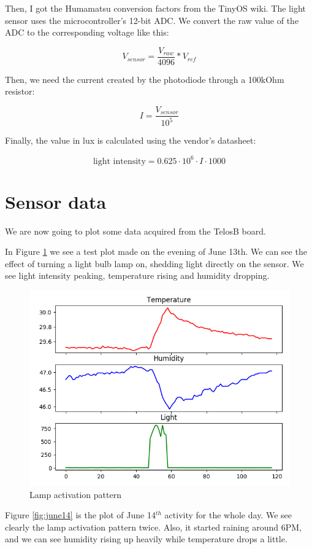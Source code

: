 \documentclass[11pt]{article}
\begin{document}
Then, I got the Humamatsu conversion factors from the TinyOS wiki. The light sensor uses the microcontroller's 12-bit ADC. We convert the raw value of the ADC to the corresponding voltage like this:

$$ V_{sensor}=\frac{V_{raw}}{4096} * V_{ref} $$ 

Then, we need the current created by the photodiode through a 100kOhm resistor:

$$I = \frac{ V_{sensor} }{10^5}$$

Finally, the value in lux is calculated using the vendor's datasheet: 

$$\text{light intensity} = 0.625\cdot10^6 \cdot I \cdot 1000$$
  

\section{Sensor data}

We are now going to plot some data acquired from the TelosB board.

In Figure \ref{fig:lamp} we see a test plot made on the evening of June 13th. We can see the effect of turning a light bulb lamp on, shedding light directly on the sensor. We see light intensity peaking, temperature rising and humidity dropping.


\begin{figure}[h]
\includegraphics[width=\textwidth]{lamp}
\caption{Lamp activation pattern}
\label{fig:lamp}
\end{figure}

Figure \ref{fig:june14} is the plot of June 14$^{th}$ activity for the whole day. We see clearly the lamp activation pattern twice. Also, it started raining around 6PM, and we can see humidity rising up heavily while temperature drops a little.
\end{document}
